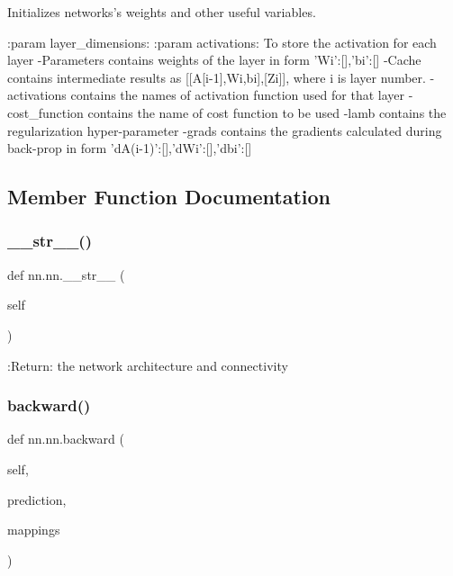 \begin{DoxyVerb}Initializes networks's weights and other useful variables.

:param layer_dimensions:
:param activations: To store the activation for each layer
-Parameters contains weights of the layer in form {'Wi':[],'bi':[]}
-Cache contains intermediate results as [[A[i-1],Wi,bi],[Zi]], where i
 is layer number.
-activations contains the names of activation function used for that layer
-cost_function  contains the name of cost function to be used
-lamb contains the regularization hyper-parameter
-grads contains the gradients calculated during back-prop in form {'dA(i-1)':[],'dWi':[],'dbi':[]}
\end{DoxyVerb}
 

\subsection{Member Function Documentation}
\mbox{\label{classnn_1_1nn_a1c967a0ae06ef2a7e8077cc9aa29aabc}} 
\subsubsection{\texorpdfstring{\+\_\+\+\_\+str\+\_\+\+\_\+()}{\_\_str\_\_()}}
{\footnotesize\ttfamily def nn.\+nn.\+\_\+\+\_\+str\+\_\+\+\_\+ (\begin{DoxyParamCaption}\item[{}]{self }\end{DoxyParamCaption})}

\begin{DoxyVerb}:Return: the network architecture and connectivity
\end{DoxyVerb}
 \mbox{\label{classnn_1_1nn_a53a7beb698fe127ebb1f636fccbaa126}} 
\subsubsection{\texorpdfstring{backward()}{backward()}}
{\footnotesize\ttfamily def nn.\+nn.\+backward (\begin{DoxyParamCaption}\item[{}]{self,  }\item[{}]{prediction,  }\item[{}]{mappings }\end{DoxyParamCaption})}

